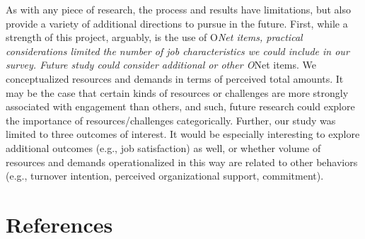 \documentclass[
  man]{apa6}
\begin{document}
As with any piece of research, the process and results have limitations, but also provide a variety of additional directions to pursue in the future. First, while a strength of this project, arguably, is the use of O\emph{Net items, practical considerations limited the number of job characteristics we could include in our survey. Future study could consider additional or other O}Net items. We conceptualized resources and demands in terms of perceived total amounts. It may be the case that certain kinds of resources or challenges are more strongly associated with engagement than others, and such, future research could explore the importance of resources/challenges categorically. Further, our study was limited to three outcomes of interest. It would be especially interesting to explore additional outcomes (e.g., job satisfaction) as well, or whether volume of resources and demands operationalized in this way are related to other behaviors (e.g., turnover intention, perceived organizational support, commitment).

\hypertarget{references}{%
\section*{References}\label{references}}
\end{document}
